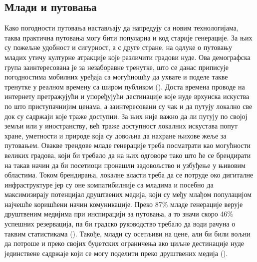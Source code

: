 \documentclass{article}
\begin{document}
\subsection{Млади и путовања}
Како погодности путовања настављају да напредују са новим технологијама, таква практична путовања могу бити популарна и код старије генерације. За њих су пожељне удобност и сигурност, а с друге стране, на одлуке о путовању младих утичу културне атракције које различити градови нуде. Ова демографска група заинтересована је за незаборавне тренутке, што се данас приписује погодностима мобилних уређаја са могућношћу да ухвате и поделе такве тренутке у реалном времену са широм публиком (\cite{frommj}). Доста времена проводе на интернету претражујући и упоређујући дестинације које нуде врхунска искуства по што приступачнијим ценама, а заинтересовани су чак и да путују локално све док су садржаји које траже доступни. За њих није важно да ли путују по својој земљи или у иностранству, већ траже доступност локалних искустава попут хране, уметности и природе која су довољна да нахране њихове жеље за путовањем. Овакве трендове младе генерације треба посматрати као могућности великих градова, који би требало да на њих одговоре тако што ће се брендирати на такав начин да би посетиоци пронашли задовољство и узбуђење у њивовим областима. Током брендирања, локалне власти треба да се потруде око дигиталне инфраструктуре јер су оне компатибилније са младима и посебно да максимизирају потенцијал друштвених медија, који су међу млађом популацијом најчешће коришћени начин комуникације. Преко 87\% младе генерације верује друштвеним медијима при инспирацији за путовања, а то значи скоро 46\% успешних резервација, па би градско руководство требало да води рачуна о таквим статистикама (\cite{oggA}). Такође, млади су осетљиви на цене, али би били вољни да потроше и преко својих буџетских ограничења ако циљне дестинације нуде јединствене садржаје који се могу поделити преко друштвених медија (\cite{starcevic}).
\end{document}
